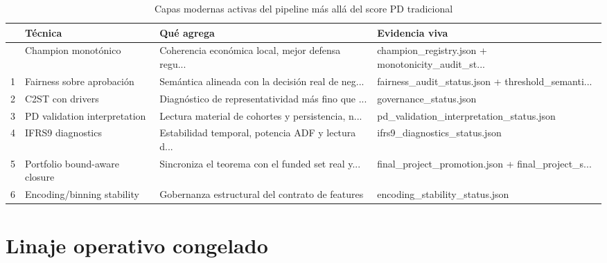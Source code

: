 \documentclass[
  spanish,
  11pt,
  letterpaper,
]{scrbook}
\theoremstyle{plain}
\theoremstyle{remark}
\begin{document}
{

\begin{longtable}[]{@{}llll@{}}

\caption{\label{tbl-modern-layers}Capas modernas activas del pipeline
más allá del score PD tradicional}

\tabularnewline

\toprule\noalign{}
& Técnica & Qué agrega & Evidencia viva \\
\midrule\noalign{}
\endhead
\bottomrule\noalign{}
\endlastfoot
0 & Champion monotónico & Coherencia económica local, mejor defensa
regu... & champion\_registry.json + monotonicity\_audit\_st... \\
1 & Fairness sobre aprobación & Semántica alineada con la decisión real
de neg... & fairness\_audit\_status.json + threshold\_semanti... \\
2 & C2ST con drivers & Diagnóstico de representatividad más fino que ...
& governance\_status.json \\
3 & PD validation interpretation & Lectura material de cohortes y
persistencia, n... & pd\_validation\_interpretation\_status.json \\
4 & IFRS9 diagnostics & Estabilidad temporal, potencia ADF y lectura
d... & ifrs9\_diagnostics\_status.json \\
5 & Portfolio bound-aware closure & Sincroniza el teorema con el funded
set real y... & final\_project\_promotion.json + final\_project\_s... \\
6 & Encoding/binning stability & Gobernanza estructural del contrato de
features & encoding\_stability\_status.json \\

\end{longtable}

}

\section{Linaje operativo congelado}\label{linaje-operativo-congelado}
\end{document}
